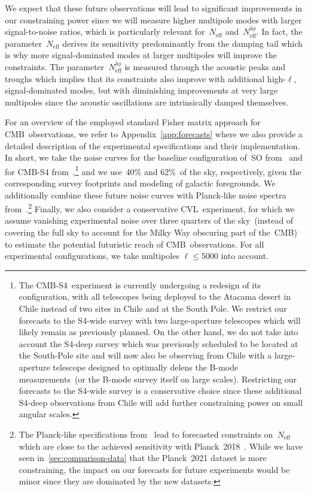 \documentclass[11pt]{article}
\numberwithin{equation}{section}
\newcommand{\Neff}{N_\mathrm{eff}}
\newcommand{\Nphase}{N_\mathrm{eff}^{\delta\phi}}
\begin{document}
We expect that these future observations will lead to significant improvements in our constraining power since we will measure higher multipole modes with larger signal-to-noise ratios, which is particularly relevant for~$\Neff$ and~$\Nphase$. In fact, the parameter~$\Neff$ derives its sensitivity predominantly from the damping tail which is why more signal-dominated modes at larger multipoles will improve the constraints. The parameter~$\Nphase$ is measured through the acoustic peaks and troughs which implies that its constraints also improve with additional high-$\ell$, signal-dominated modes, but with diminishing improvements at very large multipoles since the acoustic oscillations are intrinsically damped themselves.\medskip

For an overview of the employed standard Fisher matrix approach for CMB~observations, we refer to Appendix~\ref{app:forecasts} where we also provide a detailed description of the experimental specifications and their implementation. In short, we take the noise curves for the baseline configuration of~SO from~\cite{SimonsObservatory:2018koc, SimonsObservatory:2020noise} and for \mbox{CMB-S4} from~\cite{CMB-S4:inprep, Raghunathan:draft},\footnote{The \mbox{CMB-S4}~experiment is currently undergoing a redesign of its configuration, with all telescopes being deployed to the Atacama desert in Chile instead of two sites in Chile and at the South Pole. We restrict our forecasts to the S4-wide survey with two large-aperture telescopes which will likely remain as previously planned. On the other hand, we do not take into account the S4-deep survey which was previously scheduled to be located at the South-Pole site and will now also be observing from Chile with a large-aperture telescope designed to optimally delens the B-mode measurements~(or the B-mode survey itself on large scales). Restricting our forecasts to the S4-wide survey is a conservative choice since these additional S4-deep observations from Chile will add further constraining power on small angular scales.} and we use~40\% and 62\%~of the sky, respectively, given the corresponding survey footprints and modeling of galactic foregrounds. We additionally combine these future noise curves with Planck-like noise spectra from~\cite{Allison:2015qca}.\footnote{The Planck-like specifications from~\cite{Allison:2015qca} lead to forecasted constraints on~$\Neff$ which are close to the achieved sensitivity with Planck~2018~\cite{Baumann:2017gkg}. While we have seen in~\textsection\ref{sec:comparison-data} that the Planck~2021 dataset is more constraining, the impact on our forecasts for future experiments would be minor since they are dominated by the new datasets.} Finally, we also consider a conservative CVL~experiment, for which we assume vanishing experimental noise over three quarters of the sky~(instead of covering the full sky to account for the Milky Way obscuring part of the~CMB) to estimate the potential futuristic reach of CMB~observations. For all experimental configurations, we take multipoles $\ell \leq 5000$ into account.
\end{document}
